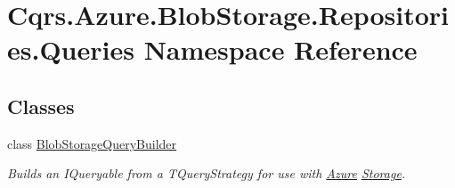\hypertarget{namespaceCqrs_1_1Azure_1_1BlobStorage_1_1Repositories_1_1Queries}{}\section{Cqrs.\+Azure.\+Blob\+Storage.\+Repositories.\+Queries Namespace Reference}
\label{namespaceCqrs_1_1Azure_1_1BlobStorage_1_1Repositories_1_1Queries}
\subsection*{Classes}
\begin{DoxyCompactItemize}
\item 
class \hyperlink{classCqrs_1_1Azure_1_1BlobStorage_1_1Repositories_1_1Queries_1_1BlobStorageQueryBuilder}{Blob\+Storage\+Query\+Builder}
\begin{DoxyCompactList}\small\item\em Builds an I\+Queryable from a {\itshape T\+Query\+Strategy}  for use with \hyperlink{namespaceCqrs_1_1Azure}{Azure} \hyperlink{namespaceCqrs_1_1Azure_1_1Storage}{Storage}. \end{DoxyCompactList}\end{DoxyCompactItemize}
